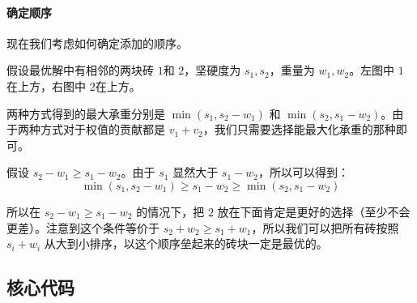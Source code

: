 \paragraph{确定顺序} 现在我们考虑如何确定添加的顺序。

假设最优解中有相邻的两块砖 $1$和 $2$，坚硬度为 $s_1,s_2$，重量为 $w_1,w_2$。左图中 $1$ 在上方，右图中 $2$在上方。 

两种方式得到的最大承重分别是 $\min(s_1,s_2-w_1)$ 和 $\min(s_2,s_1-w_2)$。由于两种方式对于权值的贡献都是 $v_1+v_2$，我们只需要选择能最大化承重的那种即可。

假设 $s_2-w_1\ge s_1-w_2$。由于 $s_1$ 显然大于 $s_1 - w_2$，所以可以得到：
$$
\min(s_1,s_2-w_1) \ge s_1-w_2 \ge \min(s_2,s_1-w_2)
$$

所以在 $s_2-w_1\ge s_1-w_2$ 的情况下，把 $2$ 放在下面肯定是更好的选择（至少不会更差）。注意到这个条件等价于  $s_2 +w_2 \ge s_1+w_1$，所以我们可以把所有砖按照 $s_i + w_i$ 从大到小排序，以这个顺序垒起来的砖块一定是最优的。



\subsection*{核心代码}
\inputminted[linenos,autogobble]{cpp}{./Code/X.cpp}
\newpage